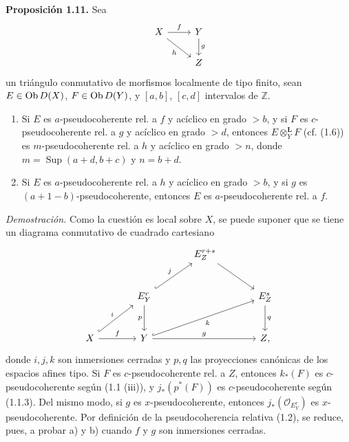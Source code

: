 \providecommand{\sisi}[2]{#2}

\textbf{Proposición 1.11.} Sea
\[
\begin{tikzcd}
X \arrow[r,"f"] \arrow[dr,"\sisi{f}{h}"'] & Y \arrow[d,"g"]\\
& Z
\end{tikzcd}
\]
un triángulo conmutativo de morfismos localmente de tipo finito, sean \(E\in\operatorname{Ob} D(X)\), \(F\in\operatorname{Ob} D(Y)\), y \([a,b]\), \([c,d]\) intervalos de \(\mathbb Z\).
\begin{enumerate}[label=\alph*)]
\item Si \(E\) es \(a\)-pseudocoherente rel. a \(f\) y acíclico en grado \(>b\), y si \(F\) es \(c\)-pseudocoherente rel. a \(g\) y acíclico en grado \(>d\), entonces \(E\otimes_Y^{\mathbf L}F\) (cf. (1.6)) es \(m\)-pseudocoherente rel. a \(h\) y acíclico en grado \(>n\), donde \(m=\operatorname{Sup}(a+d,b+c)\) y \(n=b+d\).

\item Si \(E\) es \(a\)-pseudocoherente rel. a \(h\) y acíclico en grado \(>b\), y si \(g\) es \((a+1-b)\)-pseudocoherente, entonces \(E\) es \(a\)-pseudocoherente rel. a \(f\).
\end{enumerate}

\emph{Demostración.} Como la cuestión es local sobre \(X\), se puede suponer que se tiene un diagrama conmutativo de cuadrado cartesiano
\[
\begin{tikzcd}[column sep=large,row sep=large]
& & E^{r+s}_Z \arrow[dr] & \\
& E^r_Y \arrow[ur,hook,"j"] \arrow[d,"p"'] & & E^s_Z \arrow[d,"q"]\\
X \arrow[ur,hook,"i"] \arrow[r,"f"] & Y \arrow[urr,hook,"k"'] \arrow[rr,"g"] & & Z{,}
\end{tikzcd}
\]
donde \(i,j,k\) son inmersiones cerradas y \(p,q\) las proyecciones canónicas de los espacios afines tipo. Si \(F\) es \(c\)-pseudocoherente rel. a \(Z\), entonces \(k_*(F)\) es \(c\)-pseudocoherente según (1.1 (iii)), y \(j_*(p^*(F))\) es \(c\)-pseudocoherente según (1.1.3). Del mismo modo, si \(g\) es \(x\)-pseudocoherente, entonces \(j_*(\mathcal O_{E^r_Y})\) es \(x\)-pseudocoherente. Por definición de la pseudocoherencia relativa (1.2), se reduce, pues, a probar a) y b) cuando \(f\) y \(g\) son inmersiones cerradas.

